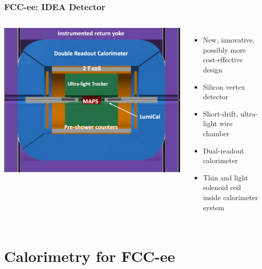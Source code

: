 \documentclass[aspectratio=169]{beamer}
\begin{document}
\begin{frame}
  \frametitle{FCC-ee: IDEA Detector}

  \begin{columns}[c]
    \begin{center}
      \includegraphics[width=\linewidth]{figures/FCC_ee_IDEA.png}
    \end{center}

    \begin{itemize}
      \item New, innovative, possibly more cost-effective design
      \item Silicon vertex detector
      \item Short-drift, ultra-light wire chamber
      \item Dual-readout calorimeter
      \item Thin and light solenoid coil inside calorimeter system
    \end{itemize}
  \end{columns}
\end{frame}


%
%
\section{Calorimetry for FCC-ee}
\end{document}
